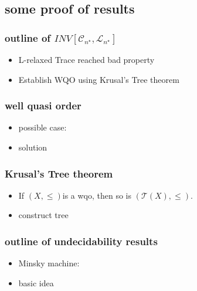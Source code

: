 \subsection{some proof of results}
\begin{frame}
    \frametitle{outline of $INV[\mathcal{C}_{n^{\star}},\mathcal{L}_{n^{\star}}]$}
    \begin{itemize}
        \item L-relaxed Trace reached bad property
        \item Establish WQO using Krusal's Tree theorem
    \end{itemize}
\end{frame}
\begin{frame}
    \frametitle{well quasi order}
    \begin{itemize}
        \item possible case:
        \item solution
    \end{itemize}
\end{frame}
\begin{frame}
    \frametitle{Krusal's Tree theorem}
    \begin{itemize}
        \item If $(X,\le)$is a wqo, then so is $(\mathcal{T}(X),\le)$.
        \item construct tree
    \end{itemize}
\end{frame}
\begin{frame}
    \frametitle{outline of undecidability results}
    \begin{itemize}
        \item Minsky machine:
        \item basic idea
    \end{itemize}
\end{frame}
